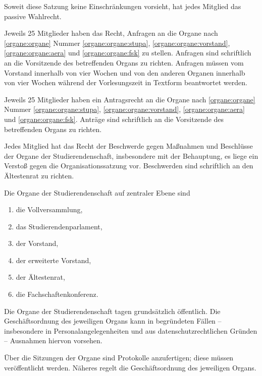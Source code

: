 \begin{contract}
Soweit diese Satzung keine Einschränkungen vorsieht, hat jedes Mitglied das passive Wahlrecht.

Jeweils 25 Mitglieder haben das Recht, Anfragen an die Organe nach \ref{organe:organe} Nummer \ref{organe:organe:stupa}, \ref{organe:organe:vorstand}, \ref{organe:organe:aera} und \ref{organe:organe:fsk} zu stellen. Anfragen sind schriftlich an die Vorsitzende des betreffenden Organs zu richten. 
Anfragen müssen vom Vorstand innerhalb von vier Wochen und von den anderen Organen innerhalb von vier Wochen während der Vorlesungszeit in Textform beantwortet werden.\label{studierendenschaft:mitglieder:anfragen}

Jeweils 25 Mitglieder haben ein Antragsrecht an die Organe nach \ref{organe:organe} Nummer \ref{organe:organe:stupa}, \ref{organe:organe:vorstand}, \ref{organe:organe:aera} und \ref{organe:organe:fsk}. Anträge sind schriftlich an die Vorsitzende des betreffenden Organs zu richten.\label{studierendenschaft:mitglieder:antraege}

Jedes Mitglied hat das Recht der Beschwerde gegen Maßnahmen und Beschlüsse der Organe der Studierendenschaft, insbesondere mit der Behauptung, es liege ein Verstoß gegen die Organisationssatzung vor. Beschwerden sind schriftlich an den Ältestenrat zu richten. \label{studierendenschaft:mitglieder:beschwerden} 


Die Organe der Studierendenschaft auf zentraler Ebene sind \label{organe:organe}
\begin{enumerate}
\item die Vollversammlung,
\item das Studierendenparlament, \label{organe:organe:stupa}
\item der Vorstand, \label{organe:organe:vorstand}
\item der erweiterte Vorstand,
\item der Ältestenrat, \label{organe:organe:aera}
\item die Fachschaftenkonferenz. \label{organe:organe:fsk}
\end{enumerate}

Die Organe der Studierendenschaft tagen grundsätzlich öffentlich. Die Geschäftsordnung des jeweiligen Organs kann in begründeten Fällen -- insbesondere in Personalangelegenheiten und aus datenschutzrechtlichen Gründen -- Ausnahmen hiervon vorsehen.

Über die Sitzungen der Organe sind Protokolle anzufertigen; diese müssen veröffentlicht werden. Näheres regelt die Geschäftsordnung des jeweiligen Organs.


\end{contract}
